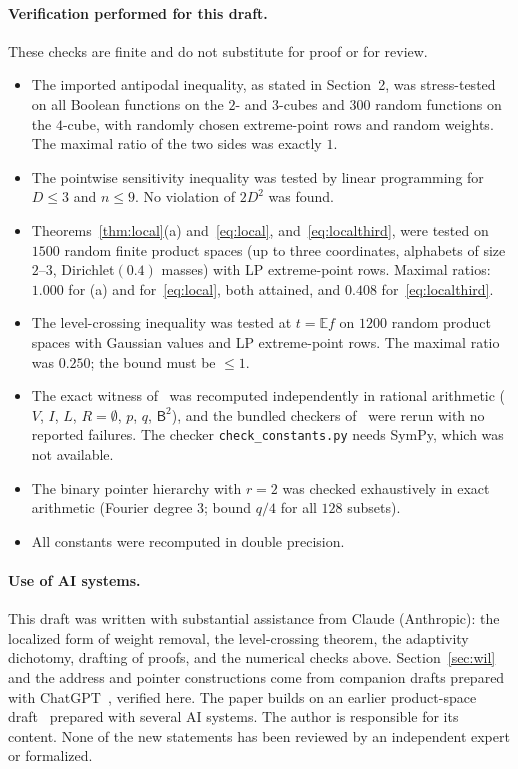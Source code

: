 \documentclass[11pt]{article}
\numberwithin{equation}{section}
\theoremstyle{definition}
\theoremstyle{remark}
\newcommand{\E}{\mathbb{E}}
\newcommand{\1}{\mathbf 1}
\begin{document}
\paragraph{Verification performed for this draft.}
These checks are finite and do not substitute for proof or for review.
\begin{itemize}[leftmargin=*,itemsep=0pt]
\item The imported antipodal inequality, as stated in Section~2, was stress-tested on all Boolean functions on the $2$- and $3$-cubes and $300$ random functions on the $4$-cube, with randomly chosen extreme-point rows and random weights. The maximal ratio of the two sides was exactly $1$.
\item The pointwise sensitivity inequality was tested by linear programming for $D\le3$ and $n\le9$. No violation of $2D^2$ was found.
\item Theorems~\ref{thm:local}(a) and~\eqref{eq:local}, and~\eqref{eq:localthird}, were tested on $1500$ random finite product spaces (up to three coordinates, alphabets of size $2$--$3$, Dirichlet$(0.4)$ masses) with LP extreme-point rows. Maximal ratios: $1.000$ for (a) and for~\eqref{eq:local}, both attained, and $0.408$ for~\eqref{eq:localthird}.
\item The level-crossing inequality was tested at $t=\E f$ on $1200$ random product spaces with Gaussian values and LP extreme-point rows. The maximal ratio was $0.250$; the bound must be $\le1$.
\item The exact witness of~\cite{WriWIL} was recomputed independently in rational arithmetic ($V$, $I$, $L$, $R=\emptyset$, $p$, $q$, $\mathsf B^2$), and the bundled checkers of~\cite{WriWIL,WriAO} were rerun with no reported failures. The checker \texttt{check\_constants.py} needs SymPy, which was not available.
\item The binary pointer hierarchy with $r=2$ was checked exhaustively in exact arithmetic (Fourier degree $3$; bound $q/4$ for all $128$ subsets).
\item All constants were recomputed in double precision.
\end{itemize}

\paragraph{Use of AI systems.} This draft was written with substantial assistance from Claude (Anthropic): the localized form of weight removal, the level-crossing theorem, the adaptivity dichotomy, drafting of proofs, and the numerical checks above. Section~\ref{sec:wil} and the address and pointer constructions come from companion drafts prepared with ChatGPT~\cite{WriWIL,WriAO}, verified here. The paper builds on an earlier product-space draft~\cite{Wri26} prepared with several AI systems. The author is responsible for its content. None of the new statements has been reviewed by an independent expert or formalized.
\end{document}
